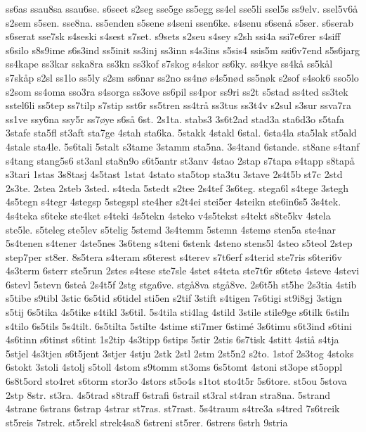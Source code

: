 ss6as
ssau8sa
ssau6se.
s6seet
s2seg
sse5ge
ss5egg
ss4el
sse5li
ssel5s
ss9elv.
ssel5v6^^e5
s2sem
s5sen.
sse8na.
ss5enden
s5sene
s4seni
ssen6ke.
s4senu
s6sen^^e5
s5ser.
s6serab
s6serat
sse7sk
s4seski
s4sest
s7set.
s9sets
s2seu
s4sey
s2sh
ssi4a
ssi7e6rer
s4siff
s6silo
s8s9ime
s6s3ind
ss5init
ss3inj
ss3inn
s4s3ins
s5sis4
ssis5m
ssi6v7end
s5s6jarg
ss4kape
ss3kar
sska8ra
ss3kn
ss3kof
s7skog
s4skor
ss6ky.
ss4kye
ss4k^^e5
ss5k^^e5l
s7sk^^e5p
s2sl
ss1lo
ss5ly
s2sm
ss6nar
ss2no
ss4n^^f8
s4s5n^^f8d
ss5n^^f8k
s2sof
s4sok6
sso5lo
s2som
ss4oma
sso3ra
s4sorga
ss3ove
ss6pil
ss4por
ss9ri
ss2t
s5stad
ss4ted
ss3tek
sstel6li
ss5tep
ss7tilp
s7stip
sst6r
ss5tren
ss4tr^^e5
ss3tus
ss3t4v
s2sul
s3sur
ssva7ra
ss1ve
ssy6na
ssy5r
ss7^^f8ye
s6s^^e5
6st.
2s1ta.
stabs3
3s6t2ad
stad3a
sta6d3o
s5tafa
3stafe
sta5fl
st3aft
sta7ge
4stah
sta6ka.
5stakk
4stakl
6stal.
6sta4la
sta5lak
st5ald
4stale
sta4le.
5s6tali
5stalt
s3tame
3stamm
sta5na.
3s4tand
6stande.
st8ane
s4tanf
s4tang
stang5s6
st3anl
sta8n9o
s6t5antr
st3anv
4stao
2stap
s7tapa
s4tapp
s8tap^^e5
s3tari
1stas
3s8tasj
4s5tast
1stat
4stato
sta5top
sta3tu
3stave
2s4t5b
st7c
2std
2s3te.
2stea
2steb
3sted.
s4teda
5stedt
s2tee
2s4tef
3s6teg.
stega6l
s4tege
3stegh
4s5tegn
s4tegr
4stegsp
5stegspl
ste4her
s2t4ei
stei5er
4steikn
ste6in6s5
3s4tek.
4s4teka
s6teke
ste4ket
s4teki
4s5tekn
4steko
v4s5tekst
s4tekt
s8te5kv
4stela
ste5le.
s5teleg
ste5lev
s5telig
5stemd
3s4temm
5stemn
4stem^^f8
sten5a
ste4nar
5s4tenen
s4tener
4ste5nes
3s6teng
s4teni
6stenk
4steno
stens5l
4steo
s5teol
2step
step7per
st8er.
8s5tera
s4teram
s6terest
s4terev
s7t6erf
s4terid
ste7ris
s6teri6v
4s3term
6sterr
ste5run
2stes
s4tese
ste7sle
4stet
s4teta
ste7t6r
s6tet^^f8
4steve
4stevi
6stevl
5stevn
6ste^^e5
2s4t5f
2stg
stga6ve.
stg^^e58va
stg^^e58ve.
2s6t5h
st5he
2s3tia
4stib
s5tibe
s9tibl
3stic
6s5tid
s6tidel
sti5en
s2tif
3stift
s4tigen
7s6tigi
st9i8gj
3stign
s5tij
6s5tika
4s5tike
s4tikl
3s6til.
5s4tila
sti4lag
4stild
3stile
stile9ge
s6tilk
6stiln
s4tilo
6s5tils
5s4tilt.
6s5tilta
5stilte
4stime
sti7mer
6stim^^e9
3s6timu
s6t3ind
s6tini
4s6tinn
s6tinst
s6tint
1s2tip
4s3tipp
6stips
5stir
2stis
6s7tisk
4stitt
4sti^^e5
s4tja
5stjel
4s3tjen
s6t5jent
3stjer
4stju
2stk
2stl
2stm
2st5n2
s2to.
1stof
2s3tog
4stoks
6stokt
3stoli
4stolj
s5toll
4stom
s9tomm
st3oms
6s5tomt
4stoni
st3ope
st5oppl
6s8t5ord
sto4ret
s6torm
stor3o
4stors
st5o4s
s1tot
sto4t5r
5s6tore.
st5ou
5stova
2stp
8str.
st3ra.
4s5trad
s8traff
6strafi
6strail
st3ral
st4ran
stra8na.
5strand
4strane
6strans
6strap
4strar
st7ras.
st7rast.
5s4traum
s4tre3a
s4tred
7s6treik
st5reis
7strek.
st5rekl
strek4sa8
6streni
st5rer.
6strers
6strh
9stria
